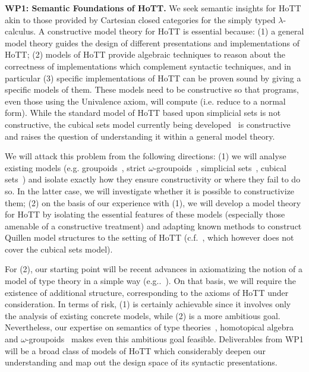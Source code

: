 \documentclass[a4paper,11pt]{article}
\begin{document}




{\bf WP1: Semantic Foundations of HoTT.}  We seek semantic insights
for HoTT akin to those provided by Cartesian closed categories for
the simply typed $\lambda$-calculus.  A constructive model theory for
HoTT is essential because: (1) a general model theory 
guides the design of different presentations and implementations of
HoTT; (2) models of HoTT provide algebraic techniques to reason
about the correctness of implementations which complement syntactic
techniques, and in particular (3) specific implementations of HoTT can
be proven sound by giving a specific models of them.  These models
need to be constructive so that programs, even those using the
Univalence axiom, will compute ({i.e.} reduce to a normal form). While
the standard model of HoTT based upon simplicial sets is not
constructive, the cubical sets model currently being developed~\cite{BezemM:cubsmt} is constructive and raises the question of understanding it
within a general model theory.

 We will attack this problem from the following directions: (1) we
 will analyse existing models ({e.g.} groupoids~\cite{HofmannM:groitt}, strict
 $\omega$-groupoids~\cite{WarrenM:strgit}, simplicial sets~\cite{KapulkinC:simmuv}, cubical sets~\cite{BezemM:cubsmt}) and isolate
 exactly how they ensure constructivity or where they fail to do
 so. In the latter case, we will investigate whether it is possible to
 constructivize them; (2) on the basis of our experience with (1), we
 will develop a model theory for HoTT by isolating the essential
 features of these models (especially those amenable of a constructive treatment)
 and  adapting known methods to construct Quillen model structures
 to the setting of HoTT ({c.f.}~\cite{ShulmanM:uniidh}, which however does not cover the cubical sets model).

For (2), our starting point will be recent advances in axiomatizing the
notion of a model of type theory in a simple way ({e.g..}~\cite{AwodeyS:natmtt}). On that basis, we will require the existence of additional
structure, corresponding to the axioms of HoTT under consideration. In
terms of risk, (1) is certainly achievable since it involves only the
analysis of existing concrete models, while (2) is a more ambitious
goal. Nevertheless, our expertise on semantics of type
theories~\cite{neil2014relParamDep}, homotopical
algebra~\cite{GambinoN:homl2c,GambinoN:weilsh} and
$\omega$-groupoids~\cite{alti:csl12} makes even this ambitious goal
feasible. Deliverables from WP1 will be a broad class of models of
HoTT which considerably deepen our understanding and map out the
design space of its syntactic presentations.
\end{document}

